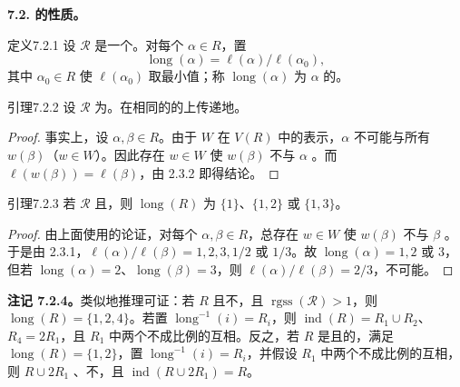 \textbf{7.2. 的性质。}
\begin{SGAresult}{定义}{7.2.1}
设 $\mathscr R$ 是一个。对每个 $\alpha\in R$，置
\[\operatorname{long}(\alpha)=\ell(\alpha)/\ell(\alpha_0),\]
其中 $\alpha_0\in R$ 使 $\ell(\alpha_0)$ 取最小值；称 $\operatorname{long}(\alpha)$ 为 $\alpha$ 的。
\end{SGAresult}
\begin{SGAresult}{引理}{7.2.2}
设 $\mathscr R$ 为。在相同的的上传递地。
\end{SGAresult}
\begin{proof}
事实上，设 $\alpha,\beta\in R$。由于 $W$ 在 $V(R)$ 中的表示，$\alpha$ 不可能与所有 $w(\beta)$（$w\in W$）。因此存在 $w\in W$ 使 $w(\beta)$ 不与 $\alpha$ 。而 $\ell(w(\beta))=\ell(\beta)$，由 2.3.2 即得结论。
\end{proof}
\begin{SGAresult}{引理}{7.2.3}
若 $\mathscr R$ 且，则 $\operatorname{long}(R)$ 为 $\{1\}$、$\{1,2\}$ 或 $\{1,3\}$。
\end{SGAresult}
\begin{proof}
由上面使用的论证，对每个 $\alpha,\beta\in R$，总存在 $w\in W$ 使 $w(\beta)$ 不与 $\beta$ 。于是由 2.3.1，$\ell(\alpha)/\ell(\beta)=1,2,3,1/2$ 或 $1/3$。故 $\operatorname{long}(\alpha)=1,2$ 或 $3$，但若 $\operatorname{long}(\alpha)=2$、$\operatorname{long}(\beta)=3$，则 $\ell(\alpha)/\ell(\beta)=2/3$，不可能。
\end{proof}
\textbf{注记 7.2.4。}类似地推理可证：若 $R$ 且不，且 $\operatorname{rgss}(\mathscr R)>1$，则 $\operatorname{long}(R)=\{1,2,4\}$。若置 $\operatorname{long}^{-1}(i)=R_i$，则 $\operatorname{ind}(R)=R_1\cup R_2$、$R_4=2R_1$，且 $R_1$ 中两个不成比例的互相。反之，若 $R$ 是且的，满足 $\operatorname{long}(R)=\{1,2\}$，置 $\operatorname{long}^{-1}(i)=R_i$，并假设 $R_1$ 中两个不成比例的互相，则 $R\cup2R_1$ 、不，且 $\operatorname{ind}(R\cup2R_1)=R$。
